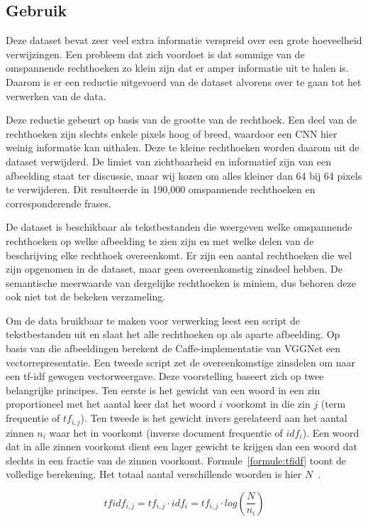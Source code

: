 \subsection{Gebruik}
\label{sub:Gebruik}
Deze dataset bevat zeer veel extra informatie verspreid over een grote hoeveelheid verwijzingen. Een probleem dat zich voordoet is dat sommige van de omspannende rechthoeken zo klein zijn dat er amper informatie uit te halen is. Daarom is er een reductie uitgevoerd van de dataset alvorens over te gaan tot het verwerken van de data. 

Deze reductie gebeurt op basis van de grootte van de rechthoek. Een deel van de rechthoeken zijn slechts enkele pixels hoog of breed, waardoor een CNN hier weinig informatie kan uithalen. Deze te kleine rechthoeken worden daarom uit de dataset verwijderd. De limiet van zichtbaarheid en informatief zijn van een afbeelding staat ter discussie, maar wij kozen om alles kleiner dan 64 bij 64 pixels te verwijderen. Dit resulteerde in 190,000 omspannende rechthoeken en corresponderende frases. 

De dataset is beschikbaar als tekstbestanden die weergeven welke omspannende rechthoeken op welke afbeelding te zien zijn en met welke delen van de beschrijving elke rechthoek overeenkomt. Er zijn een aantal rechthoeken die wel zijn opgenomen in de dataset, maar geen overeenkomstig zinsdeel hebben. De semantische meerwaarde van dergelijke rechthoeken is miniem, dus behoren deze ook niet tot de bekeken verzameling. 

Om de data bruikbaar te maken voor verwerking leest een script de tekstbestanden uit en slaat het alle rechthoeken op als aparte afbeelding. Op basis van die afbeeldingen berekent de Caffe-implementatie van VGGNet een vectorrepresentatie. Een tweede script zet de overeenkomstige zinsdelen om naar een tf-idf gewogen vectorweergave. Deze voorstelling baseert zich op twee belangrijke principes. Ten eerste is het gewicht van een woord in een zin proportioneel met het aantal keer dat het woord $i$ voorkomt in die zin $j$ (term frequentie of $tf_{i,j}$). Ten tweede is het gewicht invers gerelateerd aan het aantal zinnen $n_i$ waar het in voorkomt (inverse document frequentie of $idf_i$). Een woord dat in alle zinnen voorkomt dient een lager gewicht te krijgen dan een woord dat slechts in een fractie van de zinnen voorkomt. Formule~\eqref{formule:tfidf} toont de volledige berekening. Het totaal aantal verschillende woorden is hier $N$~\cite{Jurafsky:2009:SLP:1214993}. 

\begin{equation}
\label{formule:tfidf}
	tfidf_{i,j} = tf_{i,j}\cdot{idf_{i}} = tf_{i,j}\cdot{log(\frac{N}{n_i})}
\end{equation}

